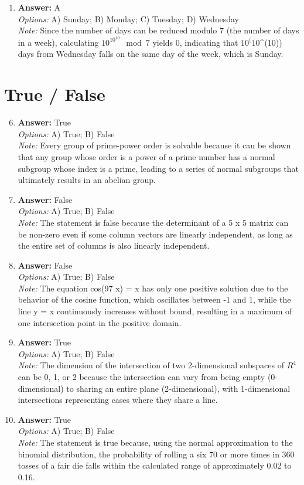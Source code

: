 \documentclass[12pt]{article}
\begin{document}
\begin{enumerate}[label=\arabic*.]
\item \textbf{Answer:} A
\\ \textit{Options:} A) Sunday; B) Monday; C) Tuesday; D) Wednesday
\\ \textit{Note:} Since the number of days can be reduced modulo 7 (the number of days in a week), calculating \(10^{10^{10}} \mod 7\) yields 0, indicating that $10^(10$^(10)) days from Wednesday falls on the same day of the week, which is Sunday.
\end{enumerate}

\section*{True / False}
\begin{enumerate}[label=\arabic*.]
\setcounter{enumi}{5}
\item \textbf{Answer:} True
\\ \textit{Options:} A) True; B) False
\\ \textit{Note:} Every group of prime-power order is solvable because it can be shown that any group whose order is a power of a prime number has a normal subgroup whose index is a prime, leading to a series of normal subgroups that ultimately results in an abelian group.
\item \textbf{Answer:} False
\\ \textit{Options:} A) True; B) False
\\ \textit{Note:} The statement is false because the determinant of a 5 x 5 matrix can be non-zero even if some column vectors are linearly independent, as long as the entire set of columns is also linearly independent.
\item \textbf{Answer:} False
\\ \textit{Options:} A) True; B) False
\\ \textit{Note:} The equation cos(97 x) = x has only one positive solution due to the behavior of the cosine function, which oscillates between -1 and 1, while the line y = x continuously increases without bound, resulting in a maximum of one intersection point in the positive domain.
\item \textbf{Answer:} True
\\ \textit{Options:} A) True; B) False
\\ \textit{Note:} The dimension of the intersection of two 2-dimensional subspaces of $R^4$ can be 0, 1, or 2 because the intersection can vary from being empty (0-dimensional) to sharing an entire plane (2-dimensional), with 1-dimensional intersections representing cases where they share a line.
\item \textbf{Answer:} True
\\ \textit{Options:} A) True; B) False
\\ \textit{Note:} The statement is true because, using the normal approximation to the binomial distribution, the probability of rolling a six 70 or more times in 360 tosses of a fair die falls within the calculated range of approximately 0.02 to 0.16.
\end{enumerate}
\end{document}
